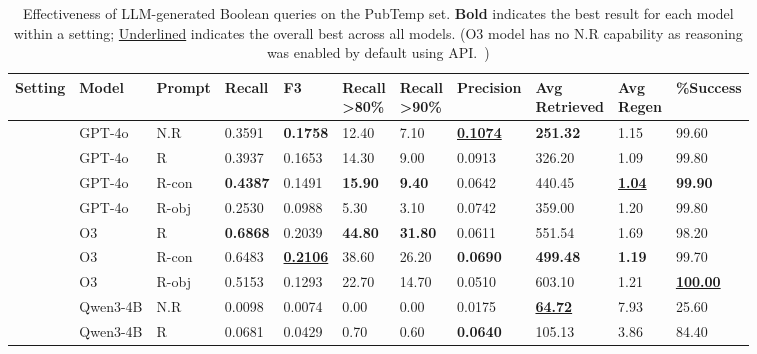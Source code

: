 
\begin{table}[t]
	\footnotesize
	\centering
	\caption{Effectiveness of LLM-generated Boolean queries on the PubTemp set. \textbf{Bold} indicates the best result for each model within a setting; \underline{Underlined} indicates the overall best across all models. (O3 model has no N.R capability as reasoning was enabled by default using API.~\vspace{-9pt})}
	\label{tab:eval-results-pubmed}
		\begin{tabular*}{\textwidth}{@{\extracolsep{\fill}}lllllllllll@{}}
			\toprule
			\cmidrule(lr){4-7} \cmidrule(lr){8-11}
			Setting & Model & Prompt & Recall & F3 & \parbox{2.5em}{Recall\\>80\%} & \parbox{2.5em}{Recall\\>90\%} & Precision & \parbox{4em}{Avg\\Retrieved} & \parbox{2.5em}{Avg\\Regen} & \%Success \\
			\midrule
			 & GPT-4o & N.R & 0.3591 & \textbf{0.1758} & 12.40 & 7.10 & \underline{\textbf{0.1074}} & \textbf{251.32} & 1.15 & 99.60 \\
			& GPT-4o & R & 0.3937 & 0.1653 & 14.30 & 9.00 & 0.0913 & 326.20 & 1.09 & 99.80 \\
			& GPT-4o & R-con & \textbf{0.4387} & 0.1491 & \textbf{15.90} & \textbf{9.40} & 0.0642 & 440.45 & \underline{\textbf{1.04}} & \textbf{99.90} \\
			& GPT-4o & R-obj & 0.2530 & 0.0988 & 5.30 & 3.10 & 0.0742 & 359.00 & 1.20 & 99.80 \\
			& O3 & R & \textbf{0.6868} & 0.2039 & \textbf{44.80} & \textbf{31.80} & 0.0611 & 551.54 & 1.69 & 98.20 \\
			& O3 & R-con & 0.6483 & \underline{\textbf{0.2106}} & 38.60 & 26.20 & \textbf{0.0690} & \textbf{499.48} & \textbf{1.19} & 99.70 \\
			& O3 & R-obj & 0.5153 & 0.1293 & 22.70 & 14.70 & 0.0510 & 603.10 & 1.21 & \underline{\textbf{100.00}} \\
			& Qwen3-4B & N.R & 0.0098 & 0.0074 & 0.00 & 0.00 & 0.0175 & \underline{\textbf{64.72}} & 7.93 & 25.60 \\
			& Qwen3-4B & R & 0.0681 & 0.0429 & 0.70 & 0.60 & \textbf{0.0640} & 105.13 & 3.86 & 84.40 \\

\end{tabular*}
\end{table}
